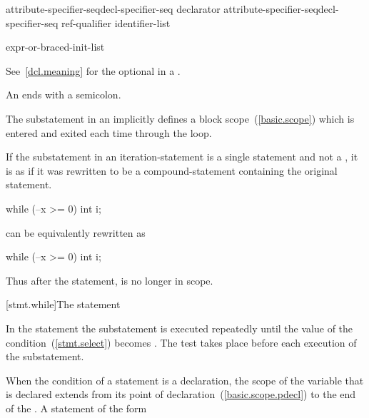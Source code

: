 \begin{bnf}
\br
    attribute-specifier-seq\opt decl-specifier-seq declarator\br
    attribute-specifier-seq\opt decl-specifier-seq ref-qualifier\opt{} \terminal{[} identifier-list \terminal{]}
\end{bnf}

\begin{bnf}
\br
    expr-or-braced-init-list
\end{bnf}

See~\ref{dcl.meaning} for the optional  in a
.
\begin{note}
An  ends with a semicolon.
\end{note}

\pnum
The substatement in an  implicitly defines
a block scope~(\ref{basic.scope}) which is entered and exited each time
through the loop.

%
If the substatement in an iteration-statement is a single statement and
not a , it is as if it was rewritten to be
a compound-statement containing the original statement.
\begin{example}

\begin{codeblock}
while (--x >= 0)
  int i;
\end{codeblock}

can be equivalently rewritten as

\begin{codeblock}
while (--x >= 0) {
  int i;
}
\end{codeblock}

Thus after the  statement,  is no longer in scope.
\end{example}

[stmt.while]{The  statement}%

\pnum
In the  statement the substatement is executed repeatedly
until the value of the condition~(\ref{stmt.select}) becomes
. The test takes place before each execution of the
substatement.

\pnum
{}%
When the condition of a  statement is a declaration, the scope of
the variable that is declared extends from its point of
declaration~(\ref{basic.scope.pdecl}) to the end of the 
. A  statement of the form


